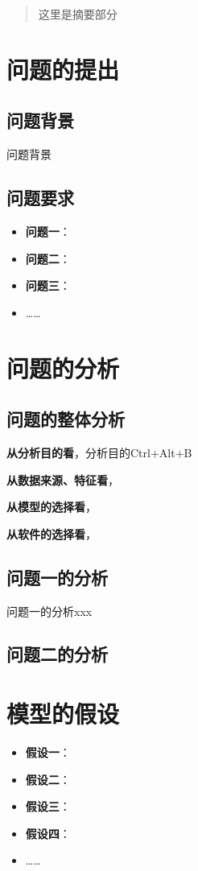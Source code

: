 \documentclass{MathorCupmodeling}
\begin{document}
	\begin{abstract}
		这里是摘要部分
	\end{abstract}

	\pagestyle{empty}
	\tableofcontents
	\newpage
	\pagestyle{fancy}

	\setcounter{page}{1}
	\section{问题的提出}
	\subsection{问题背景}
	问题背景
	\subsection{问题要求}
	\begin{itemize}
		\item \textbf{问题一}：
		\item \textbf{问题二}：
		\item \textbf{问题三}：
		\item ……
	\end{itemize}

	\section{问题的分析}
	\subsection{问题的整体分析}

	\textbf{从分析目的看}，分析目的Ctrl+Alt+B

	\textbf{从数据来源、特征看}，
	
	\textbf{从模型的选择看}，

	\textbf{从软件的选择看}，
	
	\subsection{问题一的分析}
	问题一的分析xxx
	\subsection{问题二的分析}

	\section{模型的假设}
	\begin{itemize}
		\item \textbf{假设一}：
		\item \textbf{假设二}：
		\item \textbf{假设三}：
		\item \textbf{假设四}：
		\item ……
	\end{itemize}
\end{document}
